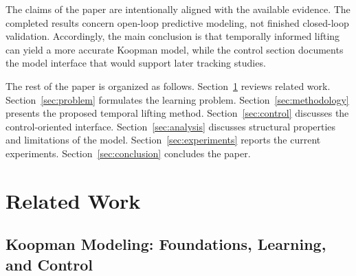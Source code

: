 \documentclass[journal]{IEEEtran}
\begin{document}
The claims of the paper are intentionally aligned with the available evidence. The completed results concern open-loop predictive modeling, not finished closed-loop validation. Accordingly, the main conclusion is that temporally informed lifting can yield a more accurate Koopman model, while the control section documents the model interface that would support later tracking studies.

The rest of the paper is organized as follows. Section~\ref{sec:related_work} reviews related work. Section~\ref{sec:problem} formulates the learning problem. Section~\ref{sec:methodology} presents the proposed temporal lifting method. Section~\ref{sec:control} discusses the control-oriented interface. Section~\ref{sec:analysis} discusses structural properties and limitations of the model. Section~\ref{sec:experiments} reports the current experiments. Section~\ref{sec:conclusion} concludes the paper.

\section{Related Work}
\label{sec:related_work}

\subsection{Koopman Modeling: Foundations, Learning, and Control}
\end{document}
